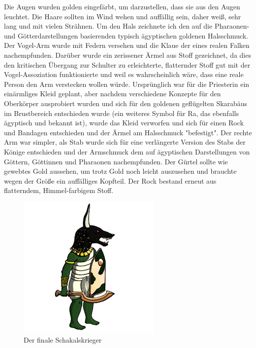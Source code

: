 \documentclass[extern,palatino]{cgBA}
\begin{document}
Die Augen wurden golden eingefärbt, um darzustellen, dass sie aus den Augen leuchtet. Die Haare sollten im Wind wehen und auffällig sein, daher weiß, sehr lang und mit vielen Strähnen. Um den Hals zeichnete ich den auf die Pharaonen- und Götterdarstellungen basierenden typisch ägyptischen goldenen Halsschmuck. Der Vogel-Arm wurde mit Federn versehen und die Klaue der eines realen Falken nachempfunden. Darüber wurde ein zerissener Ärmel aus Stoff gezeichnet, da dies den kritischen Übergang zur Schulter zu erleichterte, flatternder Stoff gut mit der Vogel-Assoziation funktionierte und weil es wahrscheinlich wäre, dass eine reale Person den Arm verstecken wollen würde. Ursprünglich war für die Priesterin ein einärmliges Kleid geplant, aber nachdem verschiedene Konzepte für den Oberkörper ausprobiert wurden und sich für den goldenen geflügelten Skarabäus im Brustbereich entschieden wurde (ein weiteres Symbol für Ra, das ebenfalls ägyptisch und bekannt ist), wurde das Kleid verworfen und sich für einen Rock und Bandagen entschieden und der Ärmel am Halsschmuck "befestigt". Der rechte Arm war simpler, als Stab wurde sich für eine verlängerte Version des Stabs der Könige entschieden und der Armschmuck dem auf ägyptischen Darstellungen von Göttern, Göttinnen und Pharaonen nachempfunden. Der Gürtel sollte wie gewebtes Gold aussehen, um trotz Gold noch leicht auszusehen und brauchte wegen der Größe ein auffälliges Kopfteil. Der Rock bestand erneut aus flatterndem, Himmel-farbigem Stoff.
	
\newpage
\begin{figure}[H]
	\centering
	\includegraphics[height=7cm]{jackal.jpg}
	\caption{Der finale Schakalskrieger}
	\label{jackal}
\end{figure}
\end{document}
